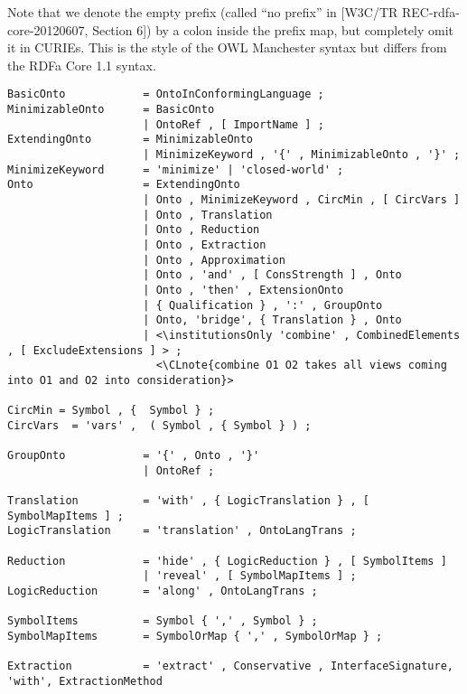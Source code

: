 \documentclass[%
\ifpretendfinal
final%
\else
draft%
\fi,
a4paper,
wd]{isov2}
\makeatletter
\newcommand*\CommentAuthor{}
\renewcommand*\CommentAuthor{#1}}
\newcommand*\CommentDate{}
\renewcommand*\CommentDate{#1}}
\newcommand*\CommentId{}
\renewcommand*\CommentId{#1}}
\newcommand*\CommentType{}
\renewcommand*\CommentType{#1}}
\newcommand*{\SetCommentColorByType}[1]{%
\edef\localType{{#1}}%
\expandafter\ifstrequal\localType{q-aut}{\colorlet{CommentColor}{red}}{%
\expandafter\ifstrequal\localType{q-all}{\colorlet{CommentColor}{orange}}{%
\expandafter\ifstrequal\localType{todo}{\colorlet{CommentColor}{orange}}{%
\expandafter\ifstrequal\localType{fyi}{\colorlet{CommentColor}{lightgray}}{%
\colorlet{CommentColor}{yellow}}}}}}
\newcommand*{\SetCommentPrefixByType}[1]{%
\edef\localType{{#1}}%
\expandafter\@ifmtarg\localType{%
\edef\CommentPrefix{}%
}{%
\caseupper[q]{#1}%
\edef\CommentPrefix{\thestring: }%
}}
\newcommand*{\initComment}[1]{%
\setkeys{Comment}{#1}%
\SetCommentColorByType{\CommentType}%
\relax%
\SetCommentPrefixByType{\CommentType}%
\relax%
}
\newcommand*{\todonote}[2][]{%
\initComment{#1}%
\pdfcomment[author=\CommentAuthor,color=CommentColor,date=\CommentDate,id=\CommentId]{%
\CommentPrefix
#2}}
\newcommand*{\todonote}[2][]{%
\initComment{#1}%
\ednote{\CommentPrefix #2}}
\newcommand*{\CLnote}[2][author=Christoph Lange]{%
\todonote[author=Christoph Lange,#1]{#2}}
\newcommand*{\nisref}[1]{[#1]}
\newcommand*{\institutionsOnly}{\bfseries\itshape}
\makeatother
\begin{document}
Note that we denote the empty prefix (called “no prefix” in \nisref{W3C/TR REC-rdfa-core-20120607, Section 6}) by a colon inside the prefix map, but completely omit it in CURIEs.  This is the style of the OWL Manchester syntax  but differs from the RDFa Core 1.1 syntax.

\label{a:dol-text:ontologies}


\begin{lstlisting}[language=ebnf,escapeinside={<>}]
BasicOnto            = OntoInConformingLanguage ;
MinimizableOnto      = BasicOnto
                     | OntoRef , [ ImportName ] ; 
ExtendingOnto        = MinimizableOnto
                     | MinimizeKeyword , '{' , MinimizableOnto , '}' ;
MinimizeKeyword      = 'minimize' | 'closed-world' ;
Onto                 = ExtendingOnto
                     | Onto , MinimizeKeyword , CircMin , [ CircVars ]
                     | Onto , Translation
                     | Onto , Reduction
                     | Onto , Extraction
                     | Onto , Approximation
                     | Onto , 'and' , [ ConsStrength ] , Onto 
                     | Onto , 'then' , ExtensionOnto
                     | { Qualification } , ':' , GroupOnto
                     | Onto, 'bridge', { Translation } , Onto
                     | <\institutionsOnly 'combine' , CombinedElements , [ ExcludeExtensions ] > ;
                       <\CLnote{combine O1 O2 takes all views coming into O1 and O2 into consideration}>

CircMin = Symbol , {  Symbol } ;
CircVars  = 'vars' ,  ( Symbol , { Symbol } ) ;

GroupOnto            = '{' , Onto , '}'
                     | OntoRef ;

Translation          = 'with' , { LogicTranslation } , [ SymbolMapItems ] ;
LogicTranslation     = 'translation' , OntoLangTrans ;
                      
Reduction            = 'hide' , { LogicReduction } , [ SymbolItems ]
                     | 'reveal' , [ SymbolMapItems ] ;
LogicReduction       = 'along' , OntoLangTrans ;

SymbolItems          = Symbol { ',' , Symbol } ;
SymbolMapItems       = SymbolOrMap { ',' , SymbolOrMap } ;

Extraction           = 'extract' , Conservative , InterfaceSignature, 'with', ExtractionMethod


\end{lstlisting}
\end{document}

